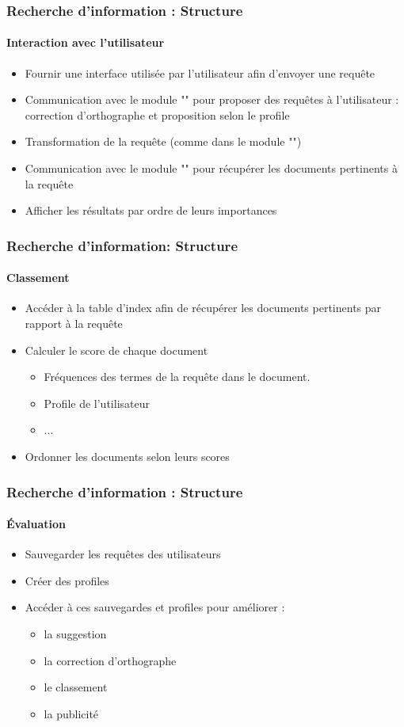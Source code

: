 \documentclass[xcolor=table]{beamer}
\begin{document}
\begin{frame}
\frametitle{Recherche d'information : Structure}
\framesubtitle{Interaction avec l'utilisateur}

\begin{itemize}
	\item Fournir une interface utilisée par l'utilisateur afin d'envoyer une requête
	\item Communication avec le module "" pour proposer des requêtes à l'utilisateur : correction d'orthographe et proposition selon le profile 
	\item Transformation de la requête (comme dans le module "")
	\item Communication avec le module "" pour récupérer les documents pertinents à la requête
	\item Afficher les résultats par ordre de leurs importances
\end{itemize}

\end{frame}


\begin{frame}
\frametitle{Recherche d'information: Structure}
\framesubtitle{Classement}

\begin{itemize}
	\item Accéder à la table d'index afin de récupérer les documents pertinents par rapport à la requête
	\item Calculer le score de chaque document
	\begin{itemize}
		\item Fréquences des termes de la requête dans le document. 
		\item Profile de l'utilisateur 
		\item ...
	\end{itemize}
	\item Ordonner les documents selon leurs scores
\end{itemize}

\end{frame}

\begin{frame}
\frametitle{Recherche d'information : Structure}
\framesubtitle{Évaluation}

\begin{itemize}
	\item Sauvegarder les requêtes des utilisateurs 
	\item Créer des profiles 
	\item Accéder à ces sauvegardes et profiles pour améliorer :
	\begin{itemize}
		\item la suggestion  
		\item la correction d'orthographe 
		\item le classement
		\item la publicité 
	\end{itemize}
\end{itemize}

\end{frame}
\end{document}
